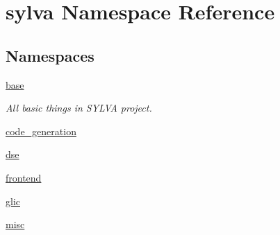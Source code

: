 \hypertarget{namespacesylva}{}\section{sylva Namespace Reference}
\label{namespacesylva}
\subsection*{Namespaces}
\begin{DoxyCompactItemize}
\item 
 \hyperlink{namespacesylva_1_1base}{base}
\begin{DoxyCompactList}\small\item\em All basic things in S\+Y\+L\+VA project. \end{DoxyCompactList}\item 
 \hyperlink{namespacesylva_1_1code__generation}{code\+\_\+generation}
\item 
 \hyperlink{namespacesylva_1_1dse}{dse}
\item 
 \hyperlink{namespacesylva_1_1frontend}{frontend}
\item 
 \hyperlink{namespacesylva_1_1glic}{glic}
\item 
 \hyperlink{namespacesylva_1_1misc}{misc}
\end{DoxyCompactItemize}
